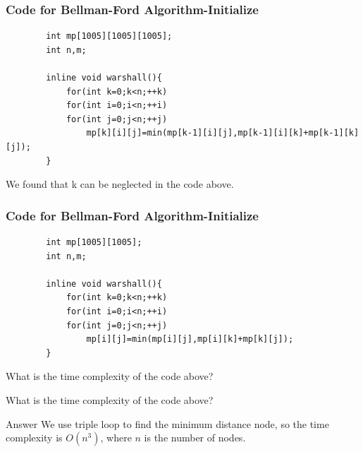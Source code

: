 \documentclass[xcolor=dvipsnames]{beamer}
\begin{document}
    \begin{frame}[fragile]
        \frametitle{Code for Bellman-Ford Algorithm-Initialize}
        \begin{verbatim}
        int mp[1005][1005][1005];
        int n,m;

        inline void warshall(){
            for(int k=0;k<n;++k)
            for(int i=0;i<n;++i)
            for(int j=0;j<n;++j)
                mp[k][i][j]=min(mp[k-1][i][j],mp[k-1][i][k]+mp[k-1][k][j]);
        }
        \end{verbatim}
    \end{frame}
    \begin{frame}[fragile]
        We found that k can be neglected in the code above.
        \frametitle{Code for Bellman-Ford Algorithm-Initialize}
        \begin{verbatim}
        int mp[1005][1005];
        int n,m;

        inline void warshall(){
            for(int k=0;k<n;++k)
            for(int i=0;i<n;++i)
            for(int j=0;j<n;++j)
                mp[i][j]=min(mp[i][j],mp[i][k]+mp[k][j]);
        }
        \end{verbatim}
    \end{frame}

    \begin{frame}
        What is the time complexity of the code above?

    \end{frame}
    \begin{frame}
        What is the time complexity of the code above?
        \begin{block}{Answer}
            We use triple loop to find the minimum distance node,
            so the time complexity is $O(n^3)$, where $n$ is the number of nodes.
        \end{block}
    \end{frame}
\end{document}
